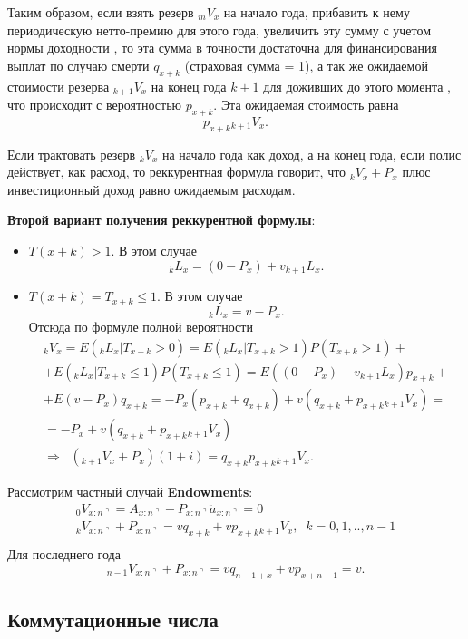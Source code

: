 Таким образом, если взять резерв $ {}_mV_x$ на начало года, прибавить к нему периодическую нетто-премию для этого года, увеличить эту сумму с учетом нормы доходности , то эта сумма в точности достаточна для финансирования выплат по случаю смерти $ q_{x+k}$ (страховая сумма = 1), а так же ожидаемой стоимости резерва $ {}_{k+1}V_x$ на конец года $ k+1$ для доживших до этого момента , что происходит с вероятностью $ p_{x+k}.$ Эта ожидаемая стоимость равна 
\[ p_{x+k}{}_{k+1}V_x. \] 

 Если трактовать резерв $ {}_kV_x$ на начало года как доход, а на конец года, если полис действует, как расход, то реккурентная формула говорит, что $ {}_kV_x+P_x$ плюс инвестиционный доход равно ожидаемым расходам.

 \textbf{Второй вариант получения реккурентной формулы}:
 \begin{itemize}
 	\item $T(x+k)>1$. В этом случае 
 	\[ {}_kL_x = (0-P_x) +v{}_{k+1}L_x.\]
 	\item $T(x+k)= T_{x+k} \leq1$. В этом случае 
 	\[ {}_kL_x  = v -P_x.\]
 	Отсюда по формуле полной вероятности 
 	\begin{gather*}
 		{}_kV_x = E({}_kL_x|T_{x+k}>0) = E({}_kL_x|T_{x+k}>1)P(T_{x+k}>1) +\\
 		+ E({}_kL_x|T_{x+k}\leq1)P(T_{x+k}\leq1) = E((0-P_x) +v{}_{k+1}L_x)p_{x+k} +\\
 		+E( v -P_x)q_{x+k} = -P_x(p_{x+k}+q_{x+k}) + v(q_{x+k}+p_{x+k}{}_{k+1}V_x)=\\
 		=-P_x +v(q_{x+k}+p_{x+k}{}_{k+1}V_x)\\
 		\Rightarrow\;\; ({}_{k+1}V_x + P_x)(1+i) = q_{x+k} p_{x+k}{}_{k+1}V_x.
 	\end{gather*}
 \end{itemize}

 \begin{example}
 	Рассмотрим частный случай \textbf{Endowments}:
 	\begin{gather*}
 		{}_0 V_{x:n\urcorner} = A_{x:n\urcorner} - P_{x:n\urcorner}\ddot{a}_{x:n\urcorner} = 0\\
 		{}_k V_{x:n\urcorner} + P_{x:n\urcorner} = vq_{x+k}+ vp_{x+k}{}_{k+1}V_x,\;\;k=0,1,..,n-1\\
	\end{gather*}
	Для последнего года 
	\[ {}_{n-1} V_{x:n\urcorner} + P_{x:n\urcorner}=vq_{n-1+x}+vp_{x+n-1} = v.\]
 \end{example}

 \subsection{Коммутационные числа} %


